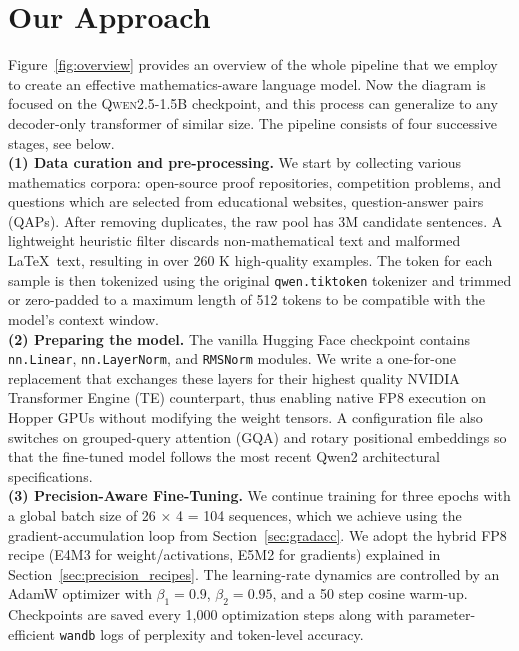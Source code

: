 \section{Our Approach}\label{sec:approach}

Figure~\ref{fig:overview} provides an overview of the whole pipeline that we employ to create an effective mathematics-aware language model. Now the diagram is focused on the \textsc{Qwen2.5-1.5B} checkpoint, and this process can generalize to any decoder-only transformer of similar size. The pipeline consists of four successive stages, see below.\\

\textbf{(1) Data curation and pre-processing.}
We start by collecting various mathematics corpora: open-source proof repositories, competition problems, and questions which are selected from educational websites, question-answer pairs (QAPs). After removing duplicates, the raw pool has 3M candidate sentences. A lightweight heuristic filter discards non-mathematical text and malformed \LaTeX\ text, resulting in over 260 K high-quality examples. The token for each sample is then tokenized using the original \texttt{qwen.tiktoken} tokenizer and trimmed or zero-padded to a maximum length of 512 tokens to be compatible with the model’s context window.\\

\textbf{(2) Preparing the model.}
The vanilla Hugging Face checkpoint contains \texttt{nn.Linear}, \texttt{nn.LayerNorm}, and \texttt{RMSNorm} modules. We write a one-for-one replacement that exchanges these layers for their highest quality NVIDIA Transformer Engine (TE) counterpart, thus enabling native FP8 execution on Hopper GPUs without modifying the weight tensors. A configuration file also switches on grouped-query attention (GQA) and rotary positional embeddings so that the fine-tuned model follows the most recent Qwen2 architectural specifications.\\

\textbf{(3) Precision-Aware Fine-Tuning.}
We continue training for three epochs with a global batch size of 26 × 4 = 104 sequences, which we achieve using the gradient-accumulation loop from Section~\ref{sec:gradacc}. We adopt the hybrid FP8 recipe (E4M3 for weight/activations, E5M2 for gradients) explained in Section~\ref{sec:precision_recipes}. The learning-rate dynamics are controlled by an AdamW optimizer with \(\beta_1=0.9\), \(\beta_2=0.95\), and a 50 step cosine warm-up. Checkpoints are saved every 1,000 optimization steps along with parameter-efficient \texttt{wandb} logs of perplexity and token-level accuracy.\\


